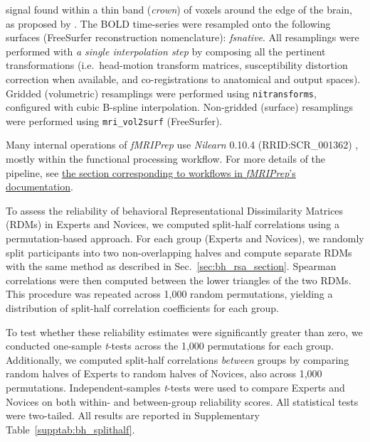 signal found within a thin band (\emph{crown}) of voxels around the edge of the brain, as proposed by \cite{patriat_improved_2017}. The BOLD time-series were resampled onto the following surfaces (FreeSurfer reconstruction nomenclature): \emph{fsnative}. All resamplings were performed with \emph{a single interpolation step} by composing all the pertinent transformations (i.e.~head-motion transform matrices, susceptibility distortion correction when available, and co-registrations to anatomical and output spaces). Gridded (volumetric) resamplings were performed using \texttt{nitransforms}, configured with cubic B-spline interpolation. Non-gridded (surface) resamplings were performed using \texttt{mri\_vol2surf} (FreeSurfer).

Many internal operations of \emph{fMRIPrep} use \emph{Nilearn} 0.10.4 \cite{nilearn} (RRID:SCR\_001362) , mostly within the functional processing workflow. For more details of the pipeline, see \href{https://fmriprep.readthedocs.io/en/latest/workflows.html}{the section corresponding to workflows in \emph{fMRIPrep}'s documentation}. 

\label{suppsec:splithalf_bh_rdm}

To assess the reliability of behavioral Representational Dissimilarity Matrices (RDMs) in Experts and Novices, we computed split-half correlations using a permutation-based approach. For each group (Experts and Novices), we randomly split participants into two non-overlapping halves and compute separate RDMs with the same method as described in Sec.~\ref{sec:bh_rsa_section}. Spearman correlations were then computed between the lower triangles of the two RDMs. This procedure was repeated across 1,000 random permutations, yielding a distribution of split-half correlation coefficients for each group.

To test whether these reliability estimates were significantly greater than zero, we conducted one-sample \textit{t}-tests across the 1,000 permutations for each group. Additionally, we computed split-half correlations \textit{between} groups by comparing random halves of Experts to random halves of Novices, also across 1,000 permutations. Independent-samples \textit{t}-tests were used to compare Experts and Novices on both within- and between-group reliability scores. All statistical tests were two-tailed. All results are reported in Supplementary Table~\ref{supptab:bh_splithalf}.

